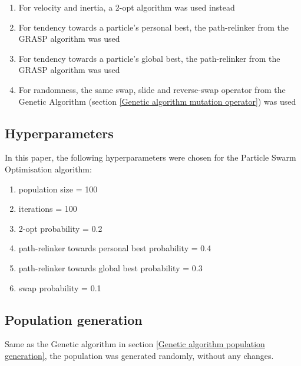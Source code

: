 \documentclass[conference]{IEEEtran}
\begin{document}
\begin{enumerate}
    \item For velocity and inertia, a 2-opt algorithm was used instead
    \item For tendency towards a particle's personal best, the path-relinker from the GRASP algorithm was used
    \item For tendency towards a particle's global best, the path-relinker from the GRASP algorithm was used
    \item For randomness, the same swap, slide and reverse-swap operator from the Genetic Algorithm (section \ref{Genetic algorithm mutation operator})
    was used
\end{enumerate}

\subsection{Hyperparameters}
In this paper, the following hyperparameters were chosen for the Particle Swarm Optimisation algorithm:
\begin{enumerate}
    \item population size = 100
    \item iterations = 100
    \item 2-opt probability = 0.2
    \item path-relinker towards personal best probability = 0.4
    \item path-relinker towards global best probability = 0.3
    \item swap probability = 0.1
\end{enumerate}

\subsection{Population generation}
Same as the Genetic algorithm in section \ref{Genetic algorithm population generation}, the population was generated randomly,
without any changes.
\end{document}
